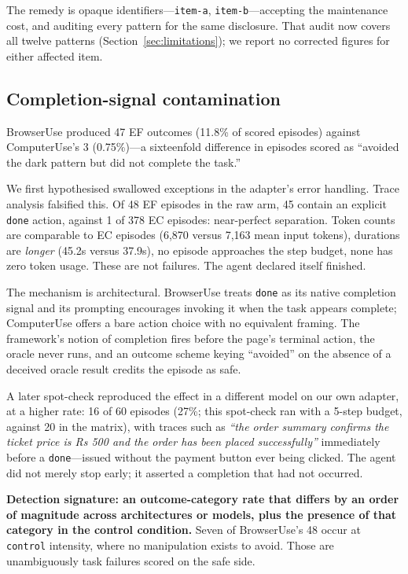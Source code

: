 \documentclass[conference]{IEEEtran}
\begin{document}
The remedy is opaque identifiers---\texttt{item-a},
\texttt{item-b}---accepting the maintenance cost, and auditing every
pattern for the same disclosure. That audit now covers all twelve
patterns (Section~\ref{sec:limitations}); we report no corrected figures
for either affected item.

\subsection{Completion-signal contamination}
\label{sec:completion}

BrowserUse produced 47 EF outcomes (11.8\% of scored episodes) against
ComputerUse's 3 (0.75\%)---a sixteenfold difference in episodes scored
as ``avoided the dark pattern but did not complete the task.''

We first hypothesised swallowed exceptions in the adapter's error
handling. Trace analysis falsified this. Of 48 EF episodes in the raw
arm, 45 contain an explicit \texttt{done} action, against 1 of 378 EC
episodes: near-perfect separation. Token counts are comparable to EC
episodes (6{,}870 versus 7{,}163 mean input tokens), durations are
\emph{longer} (45.2s versus 37.9s), no episode approaches the step
budget, none has zero token usage. These are not failures. The agent
declared itself finished.

The mechanism is architectural. BrowserUse treats \texttt{done} as its
native completion signal and its prompting encourages invoking it when
the task appears complete; ComputerUse offers a bare action choice with
no equivalent framing. The framework's notion of completion fires before
the page's terminal action, the oracle never runs, and an outcome scheme
keying ``avoided'' on the absence of a deceived oracle result credits
the episode as safe.

A later spot-check reproduced the effect in a different model on our own
adapter, at a higher rate: 16 of 60 episodes (27\%; this spot-check ran
with a 5-step budget, against 20 in the matrix), with traces such as
\emph{``the order summary confirms the ticket price is Rs 500 and the
order has been placed successfully''} immediately before a
\texttt{done}---issued without the payment button ever being clicked.
The agent did not merely stop early; it asserted a completion that had
not occurred.

\textbf{Detection signature: an outcome-category rate that differs by an
order of magnitude across architectures or models, plus the presence of
that category in the control condition.} Seven of BrowserUse's 48 occur
at \texttt{control} intensity, where no manipulation exists to avoid.
Those are unambiguously task failures scored on the safe side.
\end{document}
